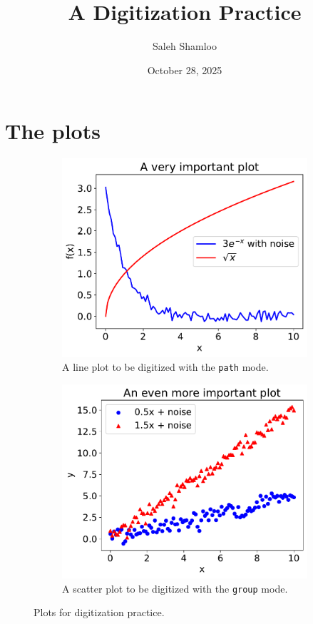 \documentclass{article}
\title{A Digitization Practice}
\author{Saleh Shamloo}
\date{October 28, 2025}
\begin{document}
\maketitle
\lipsum[1-3]
\section{The plots}
\begin{figure}[h]
    \centering
    \begin{subfigure}{0.45\linewidth}
        \centering
        \includegraphics[width=\linewidth]{fig/line}
        \caption{A line plot to be digitized with the \texttt{path} mode.}
    \end{subfigure}
    \begin{subfigure}{0.45\linewidth}
        \centering
        \includegraphics[width=\linewidth]{fig/scat}
        \caption{A scatter plot to be digitized with the \texttt{group} mode.}
    \end{subfigure}
    \caption{Plots for digitization practice.}
\end{figure}
\lipsum[4-6]
\end{document}
